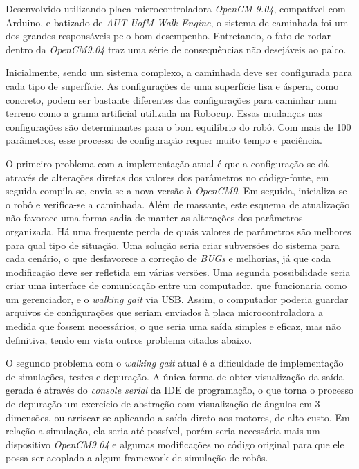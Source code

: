 Desenvolvido utilizando placa microcontroladora \textit{OpenCM 9.04}, compatível com Arduino, e batizado de \textit{AUT-UofM-Walk-Engine}, o sistema de caminhada foi um dos grandes responsáveis pelo bom desempenho. Entretando, o fato de rodar dentro da \textit{OpenCM9.04} traz uma série de consequências não desejáveis ao palco.

Inicialmente, sendo um sistema complexo, a caminhada deve ser configurada para cada tipo de superfície. As configurações de uma superfície lisa e áspera, como concreto, podem ser bastante diferentes das configurações para caminhar num terreno como a grama artificial utilizada na Robocup. Essas mudanças nas configurações são determinantes para o bom equilíbrio do robô. Com mais de 100 parâmetros, esse processo de configuração requer muito tempo e paciência.

O primeiro problema com a implementação atual é que a configuração se dá através de alterações diretas dos valores dos parâmetros no código-fonte, em seguida compila-se, envia-se a nova versão à \textit{OpenCM9}. Em seguida, inicializa-se o robô e verifica-se a caminhada. Além de massante, este esquema de atualização não favorece uma forma sadia de manter as alterações dos parâmetros organizada. Há uma frequente perda de quais valores de parâmetros são melhores para qual tipo de situação. Uma solução seria criar subversões do sistema para cada cenário, o que desfavorece a correção de \textit{BUGs} e melhorias, já que cada modificação deve ser refletida em várias versões. Uma segunda possibilidade seria criar uma interface de comunicação entre um computador, que funcionaria como um gerenciador, e o  \textit{walking gait} via USB. Assim, o computador poderia guardar arquivos de configurações que seriam enviados à placa microcontroladora a medida que fossem necessários, o que seria uma saída simples e eficaz, mas não definitiva, tendo em vista outros problema citados abaixo.

O segundo problema com o \textit{walking gait} atual é a dificuldade de implementação de simulações, testes e depuração. A única forma de obter visualização da saída gerada é através do \textit{console serial} da IDE de programação, o que torna o processo de depuração um exercício de abstração com visualização de ângulos em 3 dimensões, ou arriscar-se aplicando a saída direto aos motores, de alto custo. Em relação a simulação, ela seria até possível, porém seria necessária mais um dispositivo \textit{OpenCM9.04} e algumas modificações no código original para que ele possa ser acoplado a algum framework de simulação de robôs.

